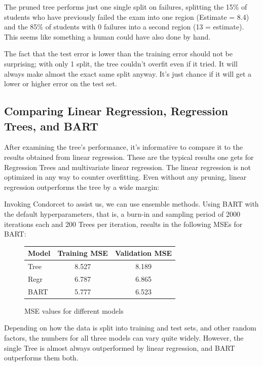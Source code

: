 \documentclass[12pt]{article}
\begin{document}
The pruned tree performs just one single split on failures, splitting the 15\% of students who have previously failed the exam into one region (Estimate = 8.4) and the 85\% of students with 0 failures into a second region (13 = estimate). This seems like something a human could have also done by hand.

The fact that the test error is lower than the training error should not be surprising; with only 1 split, the tree couldn't overfit even if it tried. It will always make almost the exact same split anyway. It's just chance if it will get a lower or higher error on the test set.


\subsection{Comparing Linear Regression, Regression Trees, and BART}

After examining the tree's performance, it's informative to compare it to the results obtained from linear regression. These are the typical results one gets for Regression Trees and multivariate linear regression. The linear regression is not optimized in any way to counter overfitting. Even without any pruning, linear regression outperforms the tree by a wide margin:

Invoking Condorcet to assist us, we can use ensemble methods. Using BART with the default hyperparameters, that is, a burn-in and sampling period of 2000 iterations each and 200 Trees per iteration, results in the following MSEs for BART:

\begin{figure}
    \centering
    \begin{tabular}{| l | c | c |}
        \hline
        Model & Training MSE & Validation MSE \\
        \hline
        Tree  & 8.527        & 8.189          \\
        Regr  & 6.787        & 6.865          \\
        BART  & 5.777        & 6.523          \\
        \hline
    \end{tabular}
    \caption{MSE values for different models}
\end{figure}

Depending on how the data is split into training and test sets, and other random factors, the numbers for all three models can vary quite widely. However, the single Tree is almost always outperformed by linear regression, and BART outperforms them both.
\end{document}
